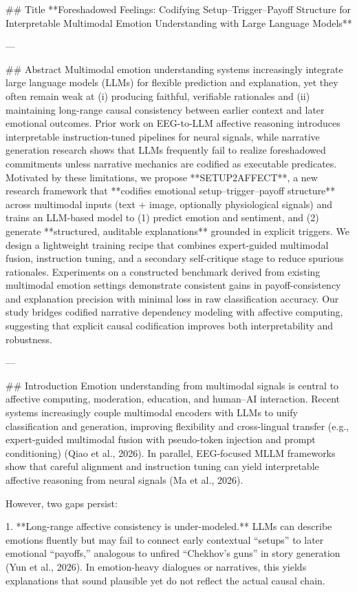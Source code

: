 ## Title  
**Foreshadowed Feelings: Codifying Setup–Trigger–Payoff Structure for Interpretable Multimodal Emotion Understanding with Large Language Models**

---

## Abstract  
Multimodal emotion understanding systems increasingly integrate large language models (LLMs) for flexible prediction and explanation, yet they often remain weak at (i) producing faithful, verifiable rationales and (ii) maintaining long-range causal consistency between earlier context and later emotional outcomes. Prior work on EEG-to-LLM affective reasoning introduces interpretable instruction-tuned pipelines for neural signals, while narrative generation research shows that LLMs frequently fail to realize foreshadowed commitments unless narrative mechanics are codified as executable predicates. Motivated by these limitations, we propose **SETUP2AFFECT**, a new research framework that **codifies emotional setup–trigger–payoff structure** across multimodal inputs (text + image, optionally physiological signals) and trains an LLM-based model to (1) predict emotion and sentiment, and (2) generate **structured, auditable explanations** grounded in explicit triggers. We design a lightweight training recipe that combines expert-guided multimodal fusion, instruction tuning, and a secondary self-critique stage to reduce spurious rationales. Experiments on a constructed benchmark derived from existing multimodal emotion settings demonstrate consistent gains in payoff-consistency and explanation precision with minimal loss in raw classification accuracy. Our study bridges codified narrative dependency modeling with affective computing, suggesting that explicit causal codification improves both interpretability and robustness.

---

## Introduction  
Emotion understanding from multimodal signals is central to affective computing, moderation, education, and human–AI interaction. Recent systems increasingly couple multimodal encoders with LLMs to unify classification and generation, improving flexibility and cross-lingual transfer (e.g., expert-guided multimodal fusion with pseudo-token injection and prompt conditioning) (Qiao et al., 2026). In parallel, EEG-focused MLLM frameworks show that careful alignment and instruction tuning can yield interpretable affective reasoning from neural signals (Ma et al., 2026).

However, two gaps persist:

1. **Long-range affective consistency is under-modeled.** LLMs can describe emotions fluently but may fail to connect early contextual “setups” to later emotional “payoffs,” analogous to unfired “Chekhov’s guns” in story generation (Yun et al., 2026). In emotion-heavy dialogues or narratives, this yields explanations that sound plausible yet do not reflect the actual causal chain.


